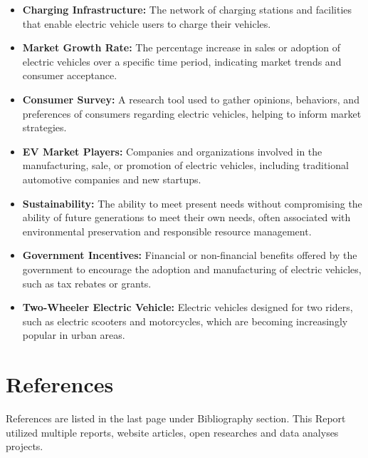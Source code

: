 \documentclass[a4paper,12pt]{report}
\begin{document}
\begin{itemize}
    \item \textbf{Charging Infrastructure:} The network of charging stations and facilities that enable electric vehicle users to charge their vehicles.
    
    \item \textbf{Market Growth Rate:} The percentage increase in sales or adoption of electric vehicles over a specific time period, indicating market trends and consumer acceptance.
    
    \item \textbf{Consumer Survey:} A research tool used to gather opinions, behaviors, and preferences of consumers regarding electric vehicles, helping to inform market strategies.
    
    \item \textbf{EV Market Players:} Companies and organizations involved in the manufacturing, sale, or promotion of electric vehicles, including traditional automotive companies and new startups.
    
    \item \textbf{Sustainability:} The ability to meet present needs without compromising the ability of future generations to meet their own needs, often associated with environmental preservation and responsible resource management.
    
    \item \textbf{Government Incentives:} Financial or non-financial benefits offered by the government to encourage the adoption and manufacturing of electric vehicles, such as tax rebates or grants.
    
    \item \textbf{Two-Wheeler Electric Vehicle:} Electric vehicles designed for two riders, such as electric scooters and motorcycles, which are becoming increasingly popular in urban areas.
\end{itemize}


\section{References}
References are listed in the last page under Bibliography section. This Report utilized multiple reports, website articles, open researches and data analyses projects.
\printbibliography
\end{document}
